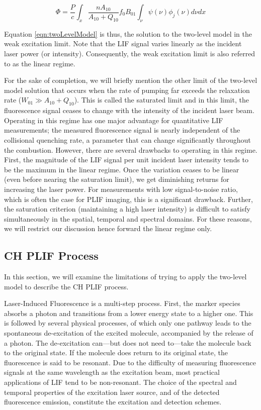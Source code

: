 \begin{equation}
  \Phi = \frac{P}{c} \int_x \frac{n A_{10}}{A_{10}+Q_{10}} f_0 B_{01} \int_\nu \psi(\nu) \phi_j(\nu) d\nu dx
  \label{eqn:twoLevelModel}
\end{equation}

Equation \ref{eqn:twoLevelModel} is thus, the solution to the two-level model in the weak excitation limit.
Note that the LIF signal varies linearly as the incident laser power (or intensity).
Consequently, the weak excitation limit is also referred to as the linear regime.

For the sake of completion, we will briefly mention the other limit of the two-level model solution that occurs when the rate of pumping far exceeds the relaxation rate (\(W_{01} \gg A_{10} + Q_{10}\)).
This is called the saturated limit and in this limit, the fluorescence signal ceases to change with the intensity of the incident laser beam.
Operating in this regime has one major advantage for quantitative LIF measurements; the measured fluorescence signal is nearly independent of the collisional quenching rate, a parameter that can change significantly throughout the combustion.
However, there are several drawbacks to operating in this regime.
First, the magnitude of the LIF signal per unit incident laser intensity tends to be the maximum in the linear regime.
Once the variation ceases to be linear (even before nearing the saturation limit), we get diminishing returns for increasing the laser power.
For measurements with low signal-to-noise ratio, which is often the case for PLIF imaging, this is a significant drawback.
Further, the saturation criterion (maintaining a high laser intensity) is difficult to satisfy simultaneously in the spatial, temporal and spectral domains.
For these reasons, we will restrict our discussion hence forward the linear regime only.

\subsection{CH PLIF Process}
\label{subsec:background-ch-plif-process}

In this section, we will examine the limitations of trying to apply the two-level model to describe the CH PLIF process.

Laser-Induced Fluorescence is a multi-step process.
First, the marker species absorbs a photon and transitions from a lower energy state to a higher one.
This is followed by several physical processes, of which only one pathway leads to the spontaneous de-excitation of the excited molecule, accompanied by the release of a photon.
The de-excitation can---but does not need to---take the molecule back to the original state.
If the molecule does return to its original state, the fluorescence is said to be resonant.
Due to the difficulty of measuring fluorescence signals at the same wavelength as the excitation beam, most practical applications of LIF tend to be non-resonant.
The choice of the spectral and temporal properties of the excitation laser source, and of the detected fluorescence emission, constitute the excitation and detection schemes.

